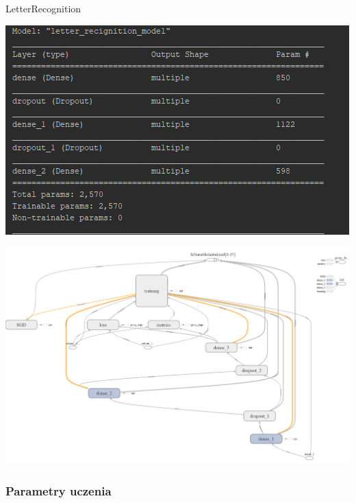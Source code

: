 \documentclass[a4paper,11pt]{article}
\begin{document}
\begin{itemize}
	\newpage
	\begin{minipage}{\linewidth}
	\item LetterRecognition\par
		\centering
		\includegraphics[width=1\linewidth]{modelLetter}
	\end{minipage}
	\begin{minipage}{\linewidth}
		\centering
		\includegraphics[width=1\linewidth]{letter-recognition-graph}
	\end{minipage}
\end{itemize}
\subsubsection{Parametry uczenia}
\end{document}
